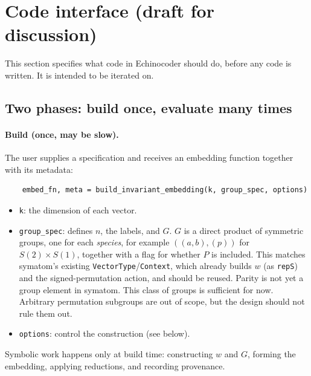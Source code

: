 \documentclass[11pt]{article}
\theoremstyle{definition}
\theoremstyle{remark}
\begin{document}
\section{Code interface (draft for discussion)}

This section specifies what code in Echinocoder should do, before any code is
written. It is intended to be iterated on.

\subsection{Two phases: build once, evaluate many times}

\paragraph{Build (once, may be slow).}
The user supplies a specification and receives an embedding function together
with its metadata:
\begin{verbatim}
    embed_fn, meta = build_invariant_embedding(k, group_spec, options)
\end{verbatim}
\begin{itemize}
  \item \texttt{k}: the dimension of each vector.
  \item \texttt{group\_spec}: defines $n$, the labels, and $G$. $G$ is a
    direct product of symmetric groups, one for each \emph{species}, for
    example $((a, b), (p))$ for $S(2) \times S(1)$, together with a flag for
    whether $P$ is included. This matches symatom's existing
    \texttt{VectorType}/\texttt{Context}, which already builds $w$ (as
    \texttt{repS}) and the signed-permutation action, and should be reused.
    Parity is not yet a group element in symatom. This class of groups is
    sufficient for now. Arbitrary permutation subgroups are out of scope, but
    the design should not rule them out.
  \item \texttt{options}: control the construction (see below).
\end{itemize}
Symbolic work happens only at build time: constructing $w$ and $G$, forming
the embedding, applying reductions, and recording provenance.
\end{document}
